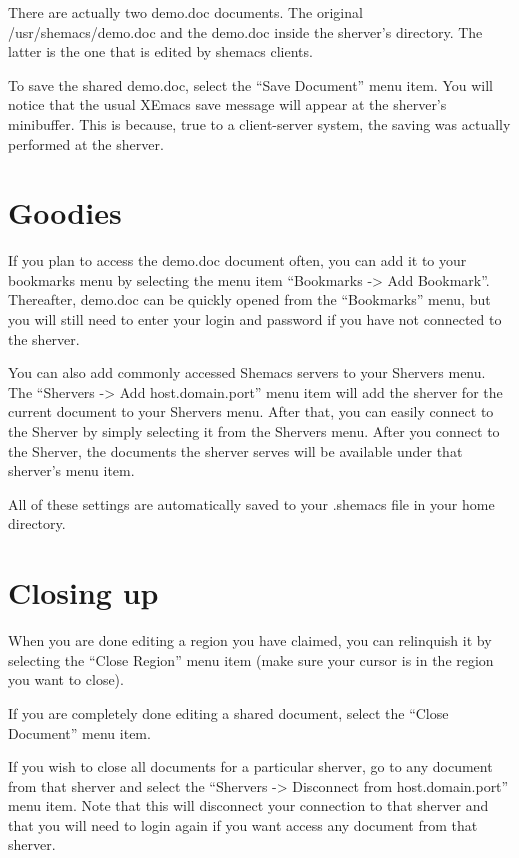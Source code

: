 There are actually two demo.doc documents. The original /usr/shemacs/demo.doc 
and the demo.doc inside the sherver's directory. The latter is the one that is 
edited by shemacs clients.

To save the shared demo.doc, select the ``Save Document'' menu item.  You will 
notice that the usual XEmacs save message will appear at the sherver's 
minibuffer.  This is because, true to a client-server system, the saving was 
actually performed at the sherver.

\section{Goodies}

If you plan to access the demo.doc document often, you can add it to your
bookmarks menu by selecting the menu item ``Bookmarks -> Add Bookmark''.  
Thereafter, demo.doc can be quickly opened from the ``Bookmarks'' menu, but you 
will still need to enter your login and password if you have not connected to 
the sherver.

You can also add commonly accessed Shemacs servers to your Shervers menu.  The 
``Shervers -> Add host.domain.port'' menu item will add the sherver for the 
current document to your Shervers menu.  After that, you can easily connect to 
the Sherver by simply selecting it from the Shervers menu.  After you connect 
to the Sherver, the documents the sherver serves will be available under that 
sherver's menu item.

All of these settings are automatically saved to your .shemacs file in your 
home directory.

\section{Closing up}

When you are done editing a region you have claimed, you can relinquish it by 
selecting the ``Close Region'' menu item (make sure your cursor is in the region 
you want to close).

If you are completely done editing a shared document, select the ``Close 
Document'' menu item.  

If you wish to close all documents for a particular sherver, go to any 
document from that sherver and select the ``Shervers -> Disconnect from 
host.domain.port'' menu item.  Note that this will disconnect your connection 
to that sherver and that you will need to login again if you want access any 
document from that sherver.

